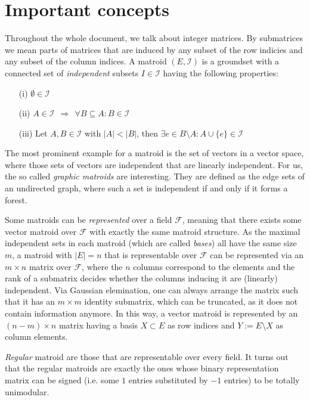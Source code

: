 \documentclass[12pt]{article}
\begin{document}
\newpage

\topmargin 0mm
\pagestyle{plain}
\parindent 5mm

\section{Important concepts}

Throughout the whole document, we talk about integer matrices. By submatrices we mean parts of matrices
that are induced by any subset of the row indicies and any subset of the column indices. A matroid
$(E, \mathcal{I})$ is a groundset with a connected set of {\em independent} subsets $I \in \mathcal{I}$
having the following properties:
\begin{enumerate}
\item[(i)]
  $\emptyset \in \mathcal{I}$
\item[(ii)]
  $A \in \mathcal{I} ~~\Rightarrow~~ \forall B \subseteq A : B \in \mathcal{I}$
\item[(iii)]
  Let $A,B \in \mathcal{I}$ with $|A| < |B|$, then $\exists e \in B \setminus A : A \cup \{e\} \in \mathcal{I}$
\end{enumerate}

The most prominent example for a matroid is the set of vectors in a vector space, where those sets of vectors are independent
that are linearly independent. For us, the so called {\em graphic matroids} are interesting. They are defined as the edge sets
of an undirected graph, where such a set is independent if and only if it forms a forest.

Some matroids can be {\em represented} over a field $\mathcal{F}$, meaning that there exists some vector matroid over $\mathcal{F}$
with exactly the same matroid structure.
As the maximal independent sets in each matroid (which are called {\em bases}) all have the same size $m$, a matroid with $|E| = n$ that is representable over $\mathcal{F}$
can be represented via an $m \times n$ matrix over $\mathcal{F}$, where the $n$ columns correspond to the elements and the rank of a submatrix decides whether
the columns inducing it are (linearly) independent. Via Gaussian elemination, one can always arrange the matrix
such that it has an $m \times m$ identity submatrix, which can be truncated, as it does not contain information anymore.
In this way, a vector matroid is represented by an $(n-m) \times n$ matrix having a basis $X \subset E$ as row indices and
$Y := E \setminus X$ as column elements.

{\em Regular} matroid are those that are representable over every field.
It turns out that the regular matroids are exactly the ones whose binary representation matrix
can be signed (i.e. some $1$ entries substituted by $-1$ entries) to be totally unimodular.
\end{document}
